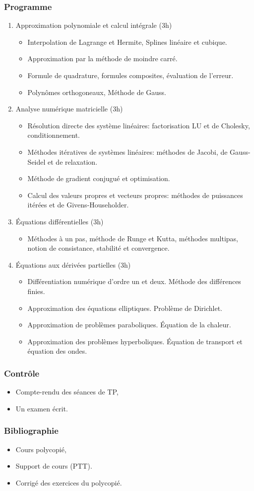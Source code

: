 \documentclass{article}
\begin{document}
\subsubsection*{Programme}
\begin{enumerate}
\item Approximation polynomiale et calcul intégrale (3h)
\begin{itemize}
\item Interpolation de Lagrange et Hermite, Splines linéaire et cubique. 
\item Approximation par la méthode de moindre carré.
\item Formule de quadrature, formules composites, évaluation de l'erreur.
\item Polynômes orthogoneaux, Méthode de Gauss.
\end{itemize}
\item Analyse numérique matricielle (3h)
	\begin{itemize}
		\item Résolution directe des système linéaires: factorisation LU et de Cholesky, conditionnement.
		\item Méthodes itératives de systèmes linéaires: méthodes de Jacobi, de Gauss-Seidel et de relaxation.
		\item Méthode de gradient conjugué et optimisation.
		\item Calcul des valeurs propres et vecteurs propres: méthodes de puissances itérées et de Givens-Householder.
	\end{itemize}
\item Équations différentielles (3h)
\begin{itemize}
\item Méthodes à un pas, méthode de Runge et Kutta, méthodes multipas, notion de consistance, stabilité et convergence.
\end{itemize}
\item Équations aux dérivées partielles  (3h)
\begin{itemize}
   \item Différentiation numérique d'ordre un et deux. Méthode des différences finies.
   \item Approximation des équations elliptiques. Problème de Dirichlet.
   \item Approximation de problèmes paraboliques. Équation de la chaleur.
   \item Approximation des problèmes hyperboliques. Équation de transport et équation des ondes.
\end{itemize}
\end{enumerate}
\subsubsection*{Contrôle}
\begin{itemize}
\item Compte-rendu des séances de TP,
\item Un examen écrit.
\end{itemize}
\subsubsection*{Bibliographie}
\begin{itemize}
\item Cours polycopié,
\item Support de cours (PTT).
\item Corrigé des exercices du polycopié.
\end{itemize}
\end{document}
